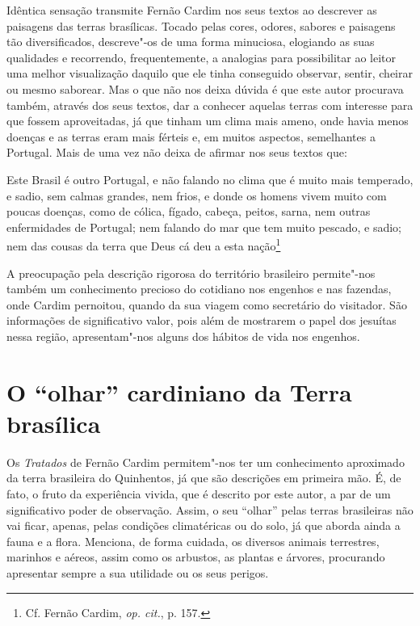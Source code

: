 Idêntica sensação transmite Fernão Cardim nos seus textos ao
descrever as paisagens das terras brasílicas. Tocado pelas cores,
odores, sabores e paisagens tão diversificados, descreve"-os de uma
forma minuciosa, elogiando as suas qualidades e recorrendo,
frequentemente, a analogias para possibilitar ao leitor uma melhor
visualização daquilo que ele tinha conseguido observar, sentir, cheirar
ou mesmo saborear. Mas o que não nos deixa dúvida é que este autor
procurava também, através dos seus textos, dar a conhecer aquelas
terras com interesse para que fossem aproveitadas, já que tinham um clima
mais ameno, onde havia menos doenças e as terras eram mais férteis e,
em muitos aspectos, semelhantes a Portugal. Mais de uma vez não deixa
de afirmar nos seus textos que:

\begin{hedraquote} 
Este Brasil é outro Portugal, e não falando no clima que é
muito mais temperado, e sadio, sem calmas grandes, nem frios, e donde
os homens vivem muito com poucas doenças, como de cólica, fígado,
cabeça, peitos, sarna, nem outras enfermidades de Portugal; nem falando
do mar que tem muito pescado, e sadio; nem das cousas da terra que Deus
cá deu a esta nação\footnote{ Cf. Fernão Cardim, \textit{op. cit.}, p. 157.} 
\end{hedraquote}

 A preocupação pela descrição rigorosa do território
brasileiro permite"-nos também um conhecimento precioso do cotidiano
nos engenhos e nas fazendas, onde Cardim pernoitou, quando da sua
viagem como secretário do visitador. São informações de significativo
valor, pois além de mostrarem o papel dos jesuítas nessa região,
apresentam"-nos alguns dos hábitos de vida nos engenhos.

\section{O ``olhar'' cardiniano da Terra brasílica}

 Os \textit{Tratados} de Fernão Cardim permitem"-nos ter um
conhecimento aproximado da terra brasileira do Quinhentos, já que são
descrições em primeira mão. É, de fato, o fruto da experiência vivida,
que é descrito por este autor, a par de um significativo poder de
observação. Assim, o seu ``olhar'' pelas terras brasileiras não vai
ficar, apenas, pelas condições climatéricas ou do solo, já que aborda
ainda a fauna e a flora. Menciona, de forma cuidada, os diversos
animais terrestres, marinhos e aéreos, assim como os arbustos, as
plantas e árvores, procurando apresentar sempre a sua utilidade ou os seus perigos.

